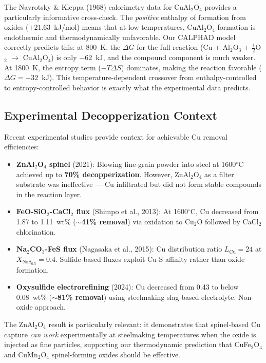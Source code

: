 \documentclass[11pt]{article}
\begin{document}
The Navrotsky \& Kleppa (1968) calorimetry data for CuAl$_2$O$_4$ provides a particularly informative cross-check. The \textit{positive} enthalpy of formation from oxides ($+21.63$~kJ/mol) means that at low temperatures, CuAl$_2$O$_4$ formation is endothermic and thermodynamically unfavorable. Our CALPHAD model correctly predicts this: at 800~K, the $\Delta G$ for the full reaction (Cu + Al$_2$O$_3$ + $\frac{1}{2}$O$_2$ $\rightarrow$ CuAl$_2$O$_4$) is only $-62$~kJ, and the compound component is much weaker. At 1800~K, the entropy term ($-T\Delta S$) dominates, making the reaction favorable ($\Delta G = -32$~kJ). This temperature-dependent crossover from enthalpy-controlled to entropy-controlled behavior is exactly what the experimental data predicts.

\subsection{Experimental Decopperization Context}

Recent experimental studies provide context for achievable Cu removal efficiencies:

\begin{itemize}[leftmargin=*]
    \item \textbf{ZnAl$_2$O$_4$ spinel} (2021): Blowing fine-grain powder into steel at 1600$^\circ$C achieved up to \textbf{70\% decopperization}. However, ZnAl$_2$O$_4$ as a filter substrate was ineffective --- Cu infiltrated but did not form stable compounds in the reaction layer.

    \item \textbf{FeO-SiO$_2$-CaCl$_2$ flux} (Shimpo et al., 2013): At 1600$^\circ$C, Cu decreased from 1.87 to 1.11~wt\% (\textbf{$\sim$41\% removal}) via oxidation to Cu$_2$O followed by CaCl$_2$ chlorination.

    \item \textbf{Na$_2$CO$_3$-FeS flux} (Nagasaka et al., 2015): Cu distribution ratio $L_{\text{Cu}} = 24$ at $X_{\text{NaS}_{0.5}} = 0.4$. Sulfide-based fluxes exploit Cu-S affinity rather than oxide formation.

    \item \textbf{Oxysulfide electrorefining} (2024): Cu decreased from 0.43 to below 0.08~wt\% (\textbf{$\sim$81\% removal}) using steelmaking slag-based electrolyte. Non-oxide approach.
\end{itemize}

The ZnAl$_2$O$_4$ result is particularly relevant: it demonstrates that spinel-based Cu capture \textit{can work} experimentally at steelmaking temperatures when the oxide is injected as fine particles, supporting our thermodynamic prediction that CuFe$_2$O$_4$ and CuMn$_2$O$_4$ spinel-forming oxides should be effective.
\end{document}
